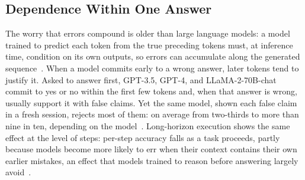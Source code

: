 \documentclass{ieeeaccess}
\begin{document}
\subsection{Dependence Within One Answer}
The worry that errors compound is older than large language models: a model trained to predict each token from the true preceding tokens must, at inference time, condition on its own outputs, so errors can accumulate along the generated sequence~\cite{bengio2015scheduled}. When a model commits early to a wrong answer, later tokens tend to justify it. Asked to answer first, GPT-3.5, GPT-4, and LLaMA-2-70B-chat commit to yes or no within the first few tokens and, when that answer is wrong, usually support it with false claims. Yet the same model, shown each false claim in a fresh session, rejects most of them: on average from two-thirds to more than nine in ten, depending on the model~\cite{zhang2024snowball}. Long-horizon execution shows the same effect at the level of steps: per-step accuracy falls as a task proceeds, partly because models become more likely to err when their context contains their own earlier mistakes, an effect that models trained to reason before answering largely avoid~\cite{sinha2025illusion}.
\end{document}
